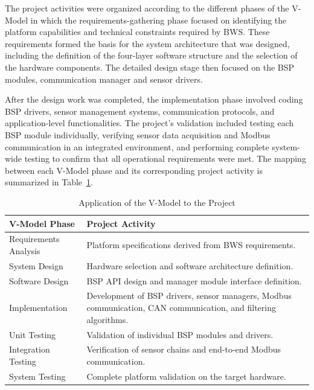 The project activities were organized according to the different phases of the V-Model in which the requirements-gathering phase focused on identifying the platform capabilities and technical constraints required by BWS. These requirements formed the basis for the system architecture that was designed, including the definition of the four-layer software structure and the selection of the hardware components.
The detailed design stage then focused on the BSP modules, communication manager and sensor drivers.

After the design work was completed, the implementation phase involved coding BSP drivers, sensor management systems, communication protocols, and application-level functionalities. The project's validation included testing each BSP module individually, verifying sensor data acquisition and Modbus communication in an integrated environment, and performing complete system-wide testing to confirm that all operational requirements were met.
The mapping between each V-Model phase and its corresponding project activity is summarized in Table~\ref{tab:vmodel_project}.
\begin{table}[H]
    \centering
    \caption{Application of the V-Model to the Project}
    \label{tab:vmodel_project}
        \begin{tabular}{|p{4.2cm}|p{9cm}|}
        \hline
        \textbf{V-Model Phase} & \textbf{Project Activity} \\
        \hline
        Requirements Analysis & Platform specifications derived from BWS requirements. \\
        \hline
        System Design & Hardware selection and software architecture definition. \\
        \hline
        Software Design & BSP API design and manager module interface definition. \\
        \hline
        Implementation & Development of BSP drivers, sensor managers, Modbus communication, CAN communication, and filtering algorithms. \\
        \hline
        Unit Testing & Validation of individual BSP modules and drivers. \\
        \hline
        Integration Testing & Verification of sensor chains and end-to-end Modbus communication. \\
        \hline
        System Testing & Complete platform validation on the target hardware. \\
        \hline
    \end{tabular}
\end{table}

